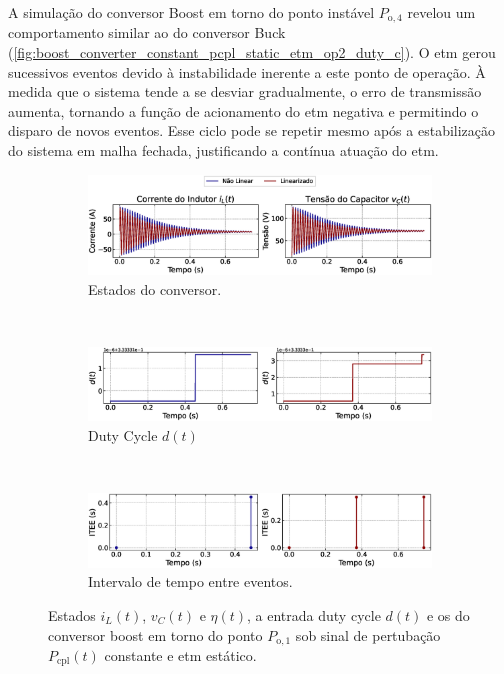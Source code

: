 A simulação do conversor Boost em torno do ponto instável $P_{\mathrm{o}, 4}$ revelou um comportamento similar ao do conversor Buck (\autoref{fig:boost_converter_constant_pcpl_static_etm_op2_duty_c}). O \acrshort{etm} gerou sucessivos eventos devido à instabilidade inerente a este ponto de operação. À medida que o sistema tende a se desviar gradualmente, o erro de transmissão aumenta, tornando a função de acionamento do \acrshort{etm}  negativa e permitindo o disparo de novos eventos. Esse ciclo pode se repetir mesmo após a estabilização do sistema em malha fechada, justificando a contínua atuação do \acrshort{etm}.

\begin{figure}[H]
  \centering
  \captionsetup{justification=centering}
  \begin{subfigure}{1.\textwidth}
    \centering
    \includegraphics[width=1.\textwidth]{figuras/dynamic-etm/boost/sim1/op1/result.eps}
    \caption{Estados do conversor.}
    \label{fig:boost_converter_constant_pcpl_dynamic_etm_op1_a}
  \end{subfigure}
  \\[6pt]
  \begin{subfigure}{1.\textwidth}
    \centering
    \includegraphics[width=1.\textwidth]{figuras/dynamic-etm/boost/sim1/op1/duty-cycle.eps}
    \caption{Duty Cycle $d(t)$}
    \label{fig:boost_converter_constant_pcpl_dynamic_etm_op1_b}
  \end{subfigure}
  \\[6pt]
  \begin{subfigure}{1.\textwidth}
    \centering
    \includegraphics[width=1.\textwidth]{figuras/dynamic-etm/boost/sim1/op1/inter-event-times.eps}
    \caption{Intervalo de tempo entre eventos.}
    \label{fig:boost_converter_constant_pcpl_dynamic_etm_op1_c}
  \end{subfigure}
  \caption{Estados $i_L(t)$, $v_C(t)$ e $\eta(t)$, a entrada duty cycle $d(t)$ e os  do conversor boost em torno do ponto $P_{\mathrm{o}, 1}$ sob sinal de pertubação $P_{\mathrm{cpl}}(t)$ constante e \acrshort{etm} estático.}
  \label{fig:boost_converter_constant_pcpl_dynamic_etm_op1}
\end{figure}

